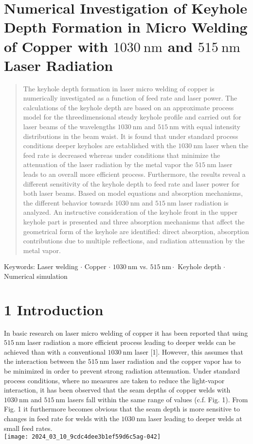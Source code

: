 \documentclass[10pt]{article}
\begin{document}
\section*{Numerical Investigation of Keyhole Depth Formation in Micro Welding of Copper with $1030 \mathrm{~nm}$ and $515 \mathrm{~nm}$ Laser Radiation }


\begin{abstract}
The keyhole depth formation in laser micro welding of copper is numerically investigated as a function of feed rate and laser power. The calculations of the keyhole depth are based on an approximate process model for the threedimensional steady keyhole profile and carried out for laser beams of the wavelengths $1030 \mathrm{~nm}$ and $515 \mathrm{~nm}$ with equal intensity distributions in the beam waist. It is found that under standard process conditions deeper keyholes are established with the $1030 \mathrm{~nm}$ laser when the feed rate is decreased whereas under conditions that minimize the attenuation of the laser radiation by the metal vapor the $515 \mathrm{~nm}$ laser leads to an overall more efficient process. Furthermore, the results reveal a different sensitivity of the keyhole depth to feed rate and laser power for both laser beams. Based on model equations and absorption mechanisms, the different behavior towards $1030 \mathrm{~nm}$ and $515 \mathrm{~nm}$ laser radiation is analyzed. An instructive consideration of the keyhole front in the upper keyhole part is presented and three absorption mechanisms that affect the geometrical form of the keyhole are identified: direct absorption, absorption contributions due to multiple reflections, and radiation attenuation by the metal vapor.
\end{abstract}

Keywords: Laser welding $\cdot$ Copper $\cdot$ $1030 \mathrm{~nm}$ vs. $515 \mathrm{~nm} \cdot$ Keyhole depth $\cdot$ Numerical simulation

\section*{1 Introduction}
In basic research on laser micro welding of copper it has been reported that using $515 \mathrm{~nm}$ laser radiation a more efficient process leading to deeper welds can be achieved than with a conventional $1030 \mathrm{~nm}$ laser [1]. However, this assumes that the interaction between the $515 \mathrm{~nm}$ laser radiation and the copper vapor has to be minimized in order to prevent strong radiation attenuation. Under standard process conditions, where no measures are taken to reduce the light-vapor interaction, it has been observed that the seam depths of copper welds with $1030 \mathrm{~nm}$ and $515 \mathrm{~nm}$ lasers fall within the same range of values (c.f. Fig. 1). From Fig. 1 it furthermore becomes obvious that the seam depth is more sensitive to changes in feed rate for welds with the $1030 \mathrm{~nm}$ laser leading to deeper welds at small feed rates.\\
\texttt{[image: 2024\_03\_10\_9cdc4dee3b1ef59d6c5ag-042]}
\end{document}
